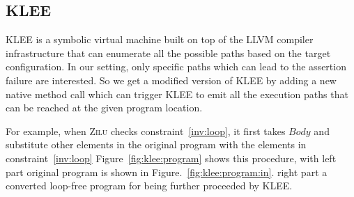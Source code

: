 



\subsection{KLEE}
\label{subsec:klee}
KLEE\cite{cadar2008klee} is a symbolic virtual machine built on top of the LLVM compiler infrastructure
that can enumerate all the possible paths based on the target configuration.
In our setting, only specific paths which can lead to the assertion failure are interested.
So we get a modified version of KLEE\cite{cadar2008klee} by adding a new native method call
which can trigger KLEE to emit all the execution paths that can be reached at the given program location.

For example, when \textsc{Zilu} checks constraint~\ref{inv:loop}, 
it first takes $Body$ and substitute other elements in the original program with the elements in constraint~\ref{inv:loop}
Figure~\ref{fig:klee:program} shows this procedure,
with left part original program is shown in Figure.~\ref{fig:klee:program:in}.
right part a converted loop-free program for being further proceeded by KLEE.

